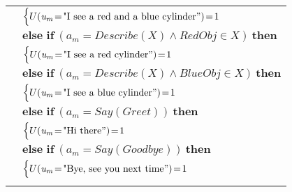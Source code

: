 \begin{footnotesize}
\begin{longtable}{p{2cm}l}
& \;\;\;\;\; $ \begin{cases}U(\mathit{u_m}\!=\!\text{"I see a red and a blue cylinder}")\!=\!1 \end{cases}$\\[3mm] & $ \textbf{else if} \ (\mathit{a_m}\!=\!\mathit{Describe({X})} \land \mathit{RedObj}\!\in\!\mathit{X}) \ \textbf{then}$ \\
& \;\;\;\;\; $ \begin{cases}U(\mathit{u_m}\!=\!\text{"I see a red cylinder}")\!=\!1 \end{cases}$\\[3mm] & $ \textbf{else if} \ (\mathit{a_m}\!=\!\mathit{Describe({X})} \land \mathit{BlueObj}\!\in\!\mathit{X}) \ \textbf{then}$ \\
& \;\;\;\;\; $ \begin{cases}U(\mathit{u_m}\!=\!\text{"I see a blue cylinder}")\!=\!1 \end{cases}$\\[3mm] & $ \textbf{else if} \ (\mathit{a_m}\!=\!\mathit{Say(Greet)}) \ \textbf{then}$ \\
& \;\;\;\;\; $ \begin{cases}U(\mathit{u_m}\!=\!\text{"Hi there}")\!=\!1 \end{cases}$\\[3mm] & $ \textbf{else if} \ (\mathit{a_m}\!=\!\mathit{Say(Goodbye)}) \ \textbf{then}$ \\
& \;\;\;\;\; $ \begin{cases}U(\mathit{u_m}\!=\!\text{"Bye, see you next time}")\!=\!1 \end{cases}$ \\ \\[-2mm]
\end{longtable}
\end{footnotesize}
